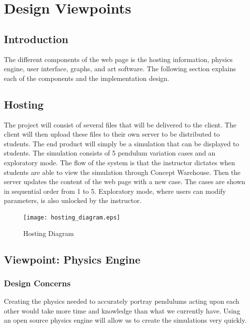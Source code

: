 \section{Design Viewpoints}

\subsection{Introduction}
The different components of the web page is the hosting information, physics engine, user interface, graphs, and art software. The following section explains each of the components and the implementation design. 
\subsection{Hosting}
The project will consist of several files that will be delivered to the client. The client will then upload these files to their own server to be distributed to students. The end product will simply be a simulation that can be displayed to students.
The simulation consists of 5 pendulum variation cases and an exploratory mode. The flow of the system is that the instructor dictates when students are able to view the simulation through Concept Warehouse. Then the server updates the content of the web page with a new case. The cases are shown in sequential order from 1 to 5. Exploratory mode, where users can modify parameters, is also unlocked by the instructor. 

\begin{figure}[H]
  \texttt{[image: hosting\_diagram.eps]}
  \caption{Hosting Diagram}
  \label{fig:host}
\end{figure}

\subsection{Viewpoint: Physics Engine}

\subsubsection{Design Concerns}
Creating the physics needed to accurately portray pendulums acting upon each other would take more time and knowledge than what we currently have. Using an open source physics engine will allow us to create the simulations very quickly.

